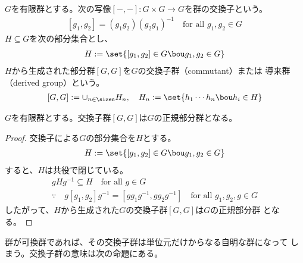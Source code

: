 {	\begin{definition}[交換子群]\label{def:交換子群} %
		$G$を有限群とする。次の写像$[-,-]:G\times G\to G$を群の交換子という。
		\begin{equation*}\begin{split}
			[g_1,g_2] = (g_1g_2)(g_2g_1)^{-1} \quad\text{for all } g_1,g_2\in G
		\end{split}\end{equation*}
		$H\subseteq G$を次の部分集合とし、
		\begin{equation*}\begin{split}
			H := \set{[g_1,g_2]\in G\bou g_1,g_2\in G}
		\end{split}\end{equation*}
		$H$から生成された部分群$[G,G]$を$G$の交換子群（commutant）または
		導来群（derived group）という。
		\begin{equation*}\begin{split}
			[G,G] := \cup_{n\in\sizen}H_n,\quad 
			H_n:=\set{h_1\cdots h_n\bou h_i\in H}
		\end{split}\end{equation*}
	\end{definition} %

	\begin{proposition}[交換子群]\label{prop:交換子群} %
		$G$を有限群とする。交換子群$[G,G]$は$G$の正規部分群となる。
	\end{proposition} %
	\begin{proof} %
		交換子による$G$の部分集合を$H$とする。
		\begin{equation*}\begin{split}
			H := \set{[g_1,g_2]\in G\bou g_1,g_2\in G}
		\end{split}\end{equation*}
		すると、$H$は共役で閉じている。
		\begin{equation*}\begin{split}
			gHg^{-1}\subseteq H \quad\text{for all } g\in G \\
			\because\quad g[g_1,g_2]g^{-1} = [gg_1g^{-1},gg_2g^{-1}]
			\quad\text{for all } g_1,g_2,g\in G
		\end{split}\end{equation*}
		したがって、$H$から生成された$G$の交換子群$[G,G]$は$G$の正規部分群
		となる。
	\end{proof} %

	群が可換群であれば、その交換子群は単位元だけからなる自明な群になって
	しまう。交換子群の意味は次の命題にある。

}
